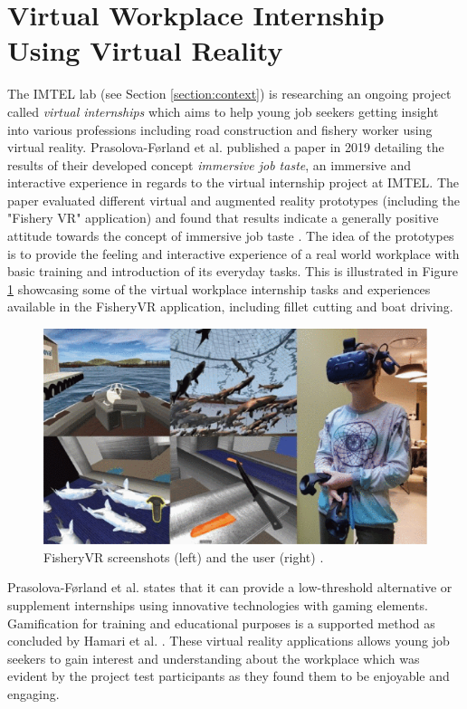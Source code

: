 \section{Virtual Workplace Internship Using Virtual Reality}
\label{section:VRworkplaceIntership}
The IMTEL lab (see Section \ref{section:context}) is researching an ongoing project called \textit{virtual internships} which aims to help young job seekers getting insight into various professions including road construction and fishery worker using virtual reality. Prasolova-Førland et al. \cite{prasolova2019empowering} published a paper in 2019 detailing the results of their developed concept \textit{immersive job taste}, an immersive and interactive experience in regards to the virtual internship project at IMTEL. The paper evaluated different virtual and augmented reality prototypes (including the "Fishery VR" application) and found that results indicate a generally positive attitude towards the concept of immersive job taste \cite{prasolova2019empowering}. The idea of the prototypes is to provide the feeling and interactive experience of a real world workplace with basic training and introduction of its everyday tasks. This is illustrated in Figure \ref{fig:FisheryVR} showcasing some of the virtual workplace internship tasks and experiences available in the FisheryVR application, including fillet cutting and boat driving. 

 \begin{figure}[!ht]
     \centering
     \includegraphics[width=.7\textwidth]{./fig/related_work/fisheryVR.png}
     \caption{FisheryVR screenshots (left) and the user (right) \cite{prasolova2019empowering}.}
     \label{fig:FisheryVR}
 \end{figure}

Prasolova-Førland et al. \cite{prasolova2019empowering} states that it can provide a low-threshold alternative or supplement internships using innovative technologies with gaming elements. Gamification for training and educational purposes is a supported method as concluded by Hamari et al. \cite{hamari2014does}. These virtual reality applications allows young job seekers to gain interest and understanding about the workplace which was evident by the project test participants as they found them to be enjoyable and engaging. 

